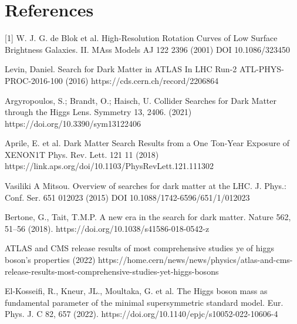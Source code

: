 \documentclass[]{article}
\begin{document}
\section*{References}

[1] W. J. G. de Blok et al. High-Resolution Rotation Curves of Low Surface Brightness
Galaxies. II. MAss Models AJ 122 2396 (2001) DOI 10.1086/323450

\par
\noindent
[2] Levin, Daniel. Search for Dark Matter in ATLAS In LHC Run-2
ATL-PHYS-PROC-2016-100 (2016) https://cds.cern.ch/record/2206864




\par
\noindent
[3] Argyropoulos, S.; Brandt, O.; Haisch, U. Collider Searches for Dark Matter 
through the Higgs Lens. Symmetry 13, 2406. (2021)
https://doi.org/10.3390/sym13122406 \par
\noindent
[4] Aprile, E. et al. Dark Matter Search Results from a One Ton-Year Exposure of XENON1T
Phys. Rev. Lett. 121 11 (2018) https://link.aps.org/doi/10.1103/PhysRevLett.121.111302


\par
\noindent
[5] Vasiliki A Mitsou. Overview of searches for dark matter at the LHC. J. Phys.: Conf. Ser. 651 012023 (2015) 
DOI 10.1088/1742-6596/651/1/012023

\par
\noindent
[6] Bertone, G., Tait, T.M.P. A new era in the search for dark matter. 
Nature 562, 51–56 (2018). https://doi.org/10.1038/s41586-018-0542-z
\par
\noindent
[7] ATLAS and CMS release results of most comprehensive studies ye of higgs boson's
properties (2022)
https://home.cern/news/news/physics/atlas-and-cms-release-results-most-comprehensive-studies-yet-higgs-bosons
\par
\noindent
[8] El-Kosseifi, R., Kneur, JL., Moultaka, G. et al. The Higgs boson mass as 
fundamental parameter of the minimal supersymmetric standard model. Eur. Phys. 
J. C 82, 657 (2022). https://doi.org/10.1140/epjc/s10052-022-10606-4 
\end{document}
